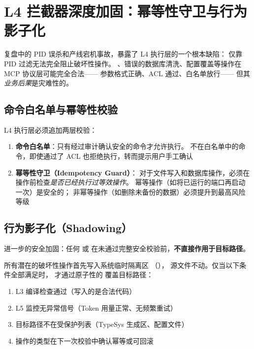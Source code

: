 \documentclass[10pt, openany]{book}
\begin{document}
\section{L4 拦截器深度加固：幂等性守卫与行为影子化}

复盘中的 PID 误杀和产线宕机事故，暴露了 L4 执行层的一个根本缺陷：
仅靠 PID 过滤无法完全阻止破坏性操作。
、错误的数据库清洗、配置覆盖等操作在 MCP 协议层可能完全合法——
参数格式正确、ACL 通过、白名单放行——
但其\emph{业务后果}是灾难性的。

\subsection{命令白名单与幂等性校验}

L4 执行层必须追加两层校验：

\begin{enumerate}
    \item \textbf{命令白名单}：只有经过审计确认安全的命令才允许执行。
        不在白名单中的命令，即使通过了 ACL 也拒绝执行，转而提示用户手工确认
    \item \textbf{幂等性守卫（Idempotency Guard）}：
        对于文件写入和数据库操作，必须在操作前检查\emph{是否已经执行过等效操作}。
        幂等操作（如将已运行的端口再启动一次）是安全的；
        非幂等操作（如删除未备份的数据）必须提升到最高风险等级
\end{enumerate}

\subsection{行为影子化（Shadowing）}

进一步的安全加固：任何  或 
在未通过完整安全校验前，\textbf{不直接作用于目标路径}。

\begin{definition}[行为影子化]
    所有潜在的破坏性操作首先写入系统临时隔离区
    （），
    源文件不动。仅当以下条件全部满足时，
    才通过原子性的  覆盖目标路径：
    \begin{enumerate}
        \item L3 编译检查通过（写入的是合法代码）
        \item L5 监控无异常信号（Token 用量正常、无频繁重试）
        \item 目标路径不在受保护列表（TypeSys 生成区、配置文件）
        \item 操作的类型在下一次校验中确认幂等或可回滚
    \end{enumerate}
\end{definition}
\end{document}
